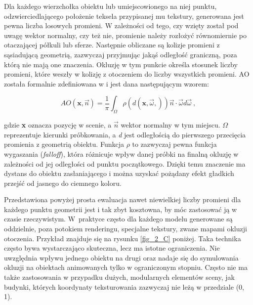 	
	Dla każdego wierzchołka obiektu lub umiejscowionego na niej punktu, odzwierciedlającego położenie teksela przypisanej mu tekstury, generowana jest pewna liczba losowych promieni. W zależności od tego, czy wzięty został pod uwagę wektor normalny, czy też nie, promienie należy rozłożyć równomiernie po otaczającej półkuli lub sferze. Następnie obliczane są kolizje promieni z sąsiadującą geometrią, zazwyczaj przyjmując jakąś odległość graniczną, poza którą nie mają one znaczenia. Okluzję w tym punkcie określa stosunek liczby promieni, które weszły w kolizję z otoczeniem do liczby wszystkich promieni. AO została formalnie zdefiniowana w \cite{sloan} i jest dana następującym wzorem:
	
	\begin{equation}
	\mathit{AO}(\mathbf{x}, \vec{n}) = \frac{1}{\pi}\int_{\Omega}^{}\rho(\mathit{d}(\mathbf{x}, \vec{\omega},))\vec{n}\cdot \vec{\omega}d\vec{\omega}\ ,
	\end{equation}
	
	gdzie \textbf{x} oznacza pozycję w scenie, a \(\vec{n}\) wektor normalny w tym miejscu. \(\Omega\) reprezentuje kierunki próbkowania, a \textit{d} jest odległością do pierwszego przecięcia promienia z geometrią obiektu. Funkcja \(\rho\) to zazwyczaj pewna funkcja wygaszania (\textit{falloff}), która różnicuje wpływ danej próbki na finalną okluzję w zależności od jej odległości od punktu początkowego. Dzięki temu znaczenie ma dystans do obiektu zasłaniającego i można uzyskać pożądany efekt gładkich przejść od jasnego do ciemnego koloru.
	
	Przedstawiona powyżej prosta ewaluacja nawet niewielkiej liczby promieni dla każdego punktu geometrii jest i tak zbyt kosztowna, by móc zastosować ją w czasie rzeczywistym. W~praktyce często dla każdego modelu generowane są oddzielnie, poza potokiem renderingu, specjalne tekstury, zwane mapami okluzji otoczenia. Przykład znajduje się na rysunku \ref{fig_2_C} poniżej. Taka technika często bywa wystarczająco skuteczna, lecz ma istotne ograniczenia. Nie uwzględnia wpływu jednego obiektu na drugi oraz nadaje się do symulowania okluzji na obiektach animowanych tylko w ograniczonym stopniu. Często nie ma także zastosowania w przypadku dużych, modularnych elementów sceny, jak budynki, których koordynaty teksturowania zazwyczaj nie leżą w przedziale (0, 1).
	
	
